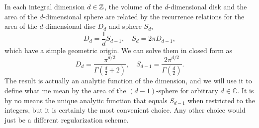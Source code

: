 In each integral dimension $d\in \mathbb{Z}$, the volume of the
$d$-dimensional disk and the area of the $d$-dimensional sphere are
related by the recurrence relations for the area of the
$d$-dimensional disc $D_d$ and sphere $S_d$,
\begin{equation}
  D_d = \frac{1}{d} S_{d-1}
  ,\quad
  S_d = 2\pi D_{d-1},
\end{equation}
which have a simple geometric origin. We can solve them in closed form
as
\begin{equation}
  D_d = \frac{\pi^{d/2}}{\Gamma(\frac{d}{2}+2)}
  ,\quad
  S_{d-1} = \frac{2 \pi^{d/2}}{\Gamma(\frac{d}{2})}.
\end{equation}
The result is actually an analytic function of the dimension, and we
will use it to define what me mean by the area of the $(d-1)$-sphere
for arbitrary $d\in\mathbb{C}$. It is by no means the unique analytic
function that equals $S_{d-1}$ when restricted to the integers, but it
is certainly the most convenient choice. Any other choice would just
be a different regularization scheme.

